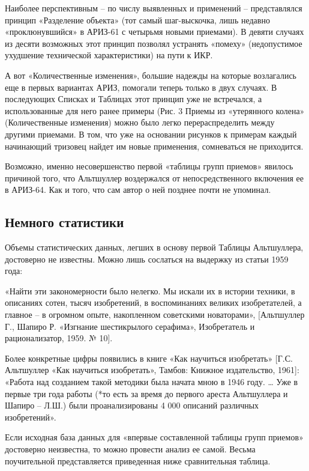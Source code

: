 \documentclass[11pt,a4paper]{article}
\begin{document}
Наиболее перспективным -- по числу выявленных и применений -- представлялся
принцип «Разделение объекта» (тот самый шаг-выскочка, лишь недавно
«проклюнувшийся» в АРИЗ-61 с четырьмя новыми приемами). В девяти случаях из
десяти возможных этот принцип позволял устранять «помеху» (недопустимое
ухудшение технической характеристики) на пути к ИКР.

А вот «Количественные изменения», большие надежды на которые возлагались еще в
первых вариантах АРИЗ, помогали теперь только в двух случаях. В последующих
Списках и Таблицах этот принцип уже не встречался, а использованные для него
ранее примеры (Рис. 3 Приемы из «утерянного колена» (Количественные изменения)
можно было легко перераспределить между другими приемами. В том, что уже на
основании рисунков к примерам каждый начинающий тризовец найдет им новые
применения, сомневаться не приходится.

Возможно, именно несовершенство первой «таблицы групп приемов» явилось
причиной того, что Альтшуллер воздержался от непосредственного включения ее в
АРИЗ-64. Как и того, что сам автор о ней позднее почти не упоминал.

\subsection*{Немного статистики}

Объемы статистических данных, легших в основу первой Таблицы Альтшуллера,
достоверно не известны. Можно лишь сослаться на выдержку из статьи 1959 года:

«Найти эти закономерности было нелегко. Мы искали их в истории техники, в
описаниях сотен, тысяч изобретений, в воспоминаниях великих изобретателей, а
главное -- в огромном опыте, накопленном советскими новаторами», [Альтшуллер
  Г., Шапиро Р. «Изгнание шестикрылого серафима», Изобретатель и
  рационализатор, 1959. № 10].

Более конкретные цифры появились в книге «Как научиться изобретать»
[Г.С. Альтшуллер «Как научиться изобретать», Тамбов: Книжное издательство,
  1961]: «Работа над созданием такой методики была начата мною в 1946 году. …
Уже в первые три года работы (*то есть за время до первого ареста Альтшуллера
и Шапиро -- Л.Ш.) были проанализированы 4 000 описаний различных изобретений».

Если исходная база данных для «впервые составленной таблицы групп приемов»
достоверно неизвестна, то можно провести анализ ее самой. Весьма поучительной
представляется приведенная ниже сравнительная таблица.
\end{document}
